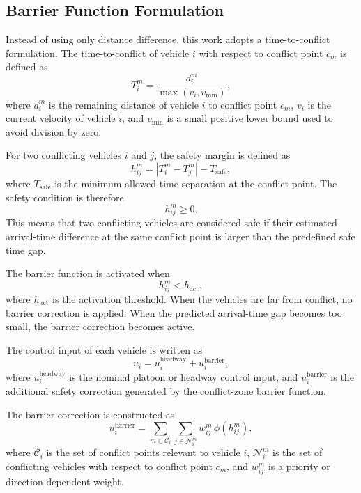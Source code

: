 \documentclass[conference]{IEEEtran}
\begin{document}
\subsection{Barrier Function Formulation}
Instead of using only distance difference, this work adopts a time-to-conflict formulation. The time-to-conflict of vehicle $i$ with respect to conflict point $c_m$ is defined as
\begin{equation}
T_i^m=\frac{d_i^m}{\max(v_i,v_{\min})},
\end{equation}
where $d_i^m$ is the remaining distance of vehicle $i$ to conflict point $c_m$, $v_i$ is the current velocity of vehicle $i$, and $v_{\min}$ is a small positive lower bound used to avoid division by zero.

For two conflicting vehicles $i$ and $j$, the safety margin is defined as
\begin{equation}
h_{ij}^m = |T_i^m-T_j^m|-T_{\text{safe}},
\end{equation}
where $T_{\text{safe}}$ is the minimum allowed time separation at the conflict point. The safety condition is therefore
\begin{equation}
h_{ij}^m \geq 0.
\end{equation}
This means that two conflicting vehicles are considered safe if their estimated arrival-time difference at the same conflict point is larger than the predefined safe time gap.

The barrier function is activated when
\begin{equation}
h_{ij}^m < h_{\text{act}},
\end{equation}
where $h_{\text{act}}$ is the activation threshold. When the vehicles are far from conflict, no barrier correction is applied. When the predicted arrival-time gap becomes too small, the barrier correction becomes active.

The control input of each vehicle is written as
\begin{equation}
u_i = u_i^{\text{headway}} + u_i^{\text{barrier}},
\end{equation}
where $u_i^{\text{headway}}$ is the nominal platoon or headway control input, and $u_i^{\text{barrier}}$ is the additional safety correction generated by the conflict-zone barrier function.

The barrier correction is constructed as
\begin{equation}
u_i^{\text{barrier}}
=
\sum_{m\in \mathcal{C}_i}
\sum_{j\in \mathcal{N}_i^m}
w_{ij}^m \, \phi(h_{ij}^m),
\end{equation}
where $\mathcal{C}_i$ is the set of conflict points relevant to vehicle $i$, $\mathcal{N}_i^m$ is the set of conflicting vehicles with respect to conflict point $c_m$, and $w_{ij}^m$ is a priority or direction-dependent weight.
\end{document}
